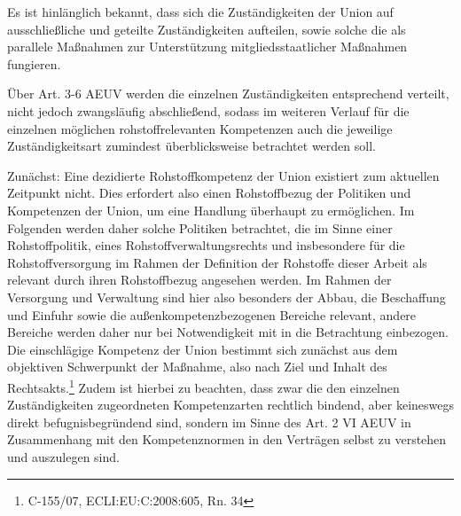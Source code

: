 \documentclass[12pt,a4paper,oneside]{book} %
\begin{document}
Es ist hinlänglich bekannt, dass sich die Zuständigkeiten der Union auf ausschließliche und geteilte Zuständigkeiten aufteilen, sowie solche die als parallele Maßnahmen zur Unterstützung mitgliedsstaatlicher Maßnahmen fungieren.\autocite{Groeben, von der/Schwarze/Walter Obwexer, 7. Aufl. 2015, AEUV Art. 2 Rn. 7}

Über Art. 3-6 AEUV werden die einzelnen Zuständigkeiten entsprechend verteilt, nicht jedoch zwangsläufig abschließend, sodass im weiteren Verlauf für die einzelnen möglichen rohstoffrelevanten Kompetenzen auch die jeweilige Zuständigkeitsart zumindest überblicksweise betrachtet werden soll.
	
Zunächst: Eine dezidierte Rohstoffkompetenz der Union existiert zum aktuellen Zeitpunkt nicht. Dies erfordert also einen Rohstoffbezug der Politiken und Kompetenzen der Union, um eine Handlung überhaupt zu ermöglichen. Im Folgenden werden daher solche Politiken betrachtet, die im Sinne einer Rohstoffpolitik, eines Rohstoffverwaltungsrechts und insbesondere für die Rohstoffversorgung im Rahmen der Definition der Rohstoffe dieser Arbeit als relevant durch ihren Rohstoffbezug angesehen werden. Im Rahmen der Versorgung und Verwaltung sind hier also besonders der Abbau, die Beschaffung und Einfuhr sowie die außenkompetenzbezogenen Bereiche relevant, andere Bereiche werden daher nur bei Notwendigkeit mit in die Betrachtung einbezogen. Die einschlägige Kompetenz der Union bestimmt sich zunächst aus dem objektiven Schwerpunkt der Maßnahme, also nach Ziel und Inhalt des Rechtsakts.\footnote{C-155/07, ECLI:EU:C:2008:605, Rn. 34}
Zudem ist hierbei zu beachten, dass zwar die den einzelnen Zuständigkeiten zugeordneten Kompetenzarten rechtlich bindend, aber keineswegs direkt befugnisbegründend sind, sondern im Sinne des Art. 2 VI AEUV in Zusammenhang mit den Kompetenznormen in den Verträgen selbst zu verstehen und auszulegen sind.\autocite{Groeben, von der/Schwarze/Walter Obwexer, 7. Aufl. 2015, AEUV Art. 2 Rn. 9}
	
\end{document}
